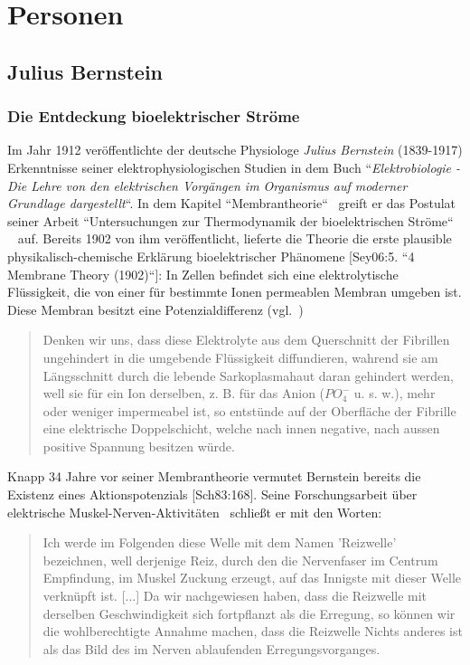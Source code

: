 \chapter{Personen}

\section{Julius Bernstein}\label{appendix:bernstein}

\subsection*{Die Entdeckung bioelektrischer Ströme}

Im Jahr 1912 veröffentlichte der deutsche Physiologe \textit{Julius Bernstein} (1839-1917) Erkenntnisse seiner elektrophysiologischen Studien in dem Buch ``\textit{Elektrobiologie - Die Lehre von den elektrischen Vorgängen im Organismus auf moderner Grundlage dargestellt}``.
In dem Kapitel ``Membrantheorie``~\cite{Ber12} greift er das Postulat seiner Arbeit ``Untersuchungen zur Thermodynamik der bioelektrischen Ströme`` ~\cite{Ber02} auf.
Bereits 1902 von ihm veröffentlicht, lieferte die Theorie die erste plausible physikalisch-chemische Erklärung bioelektrischer Phänomene [Sey06:5. ``4 Membrane Theory (1902)``]:
In Zellen befindet sich eine elektrolytische Flüssigkeit, die von einer für bestimmte Ionen permeablen Membran umgeben ist. Diese Membran besitzt eine Potenzialdifferenz (vgl.~\cite[92 f.]{Ber12})

\blockquote[{\cite[542]{Ber02}}]{
    Denken wir uns, dass diese Elektrolyte aus dem Querschnitt der Fibrillen ungehindert in die umgebende Flüssigkeit diffundieren, wahrend sie am Längsschnitt durch die lebende Sarkoplasmahaut daran gehindert werden, well sie für ein Ion derselben, z. B. für das Anion ($PO^-_4$ u. s. w.), mehr oder weniger impermeabel ist, so entstünde auf der Oberfläche der Fibrille eine elektrische Doppelschicht, welche nach innen negative, nach aussen positive Spannung besitzen würde.
}

Knapp 34 Jahre vor seiner Membrantheorie vermutet Bernstein bereits die Existenz eines Aktionspotenzials [Sch83:168]. Seine Forschungsarbeit über elektrische Muskel-Nerven-Aktivitäten~\cite{Ber68} schließt er mit den Worten:

\blockquote[{\cite[198 f.]{Ber68}}]{
    Ich werde im Folgenden diese Welle mit dem Namen 'Reizwelle' bezeichnen, well derjenige Reiz, durch den die Nervenfaser im Centrum Empfindung, im Muskel Zuckung erzeugt, auf das  Innigste mit dieser Welle verknüpft ist. {[...]} Da wir nachgewiesen haben, dass die Reizwelle mit derselben Geschwindigkeit sich fortpflanzt als die Erregung, so können wir die wohlberechtigte Annahme machen, dass die Reizwelle Nichts anderes ist als das Bild des im Nerven ablaufenden Erregungsvorganges.
}

